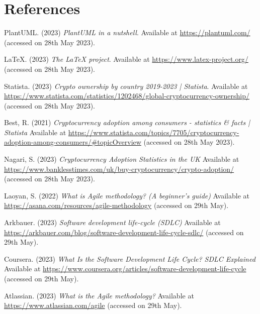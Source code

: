 \section{References}

\noindent [1] PlantUML. (2023) \textit{PlantUML in a nutshell}. Available at \url{https://plantuml.com/} (accessed on 28th May 2023).
\vspace{0.2cm}

\noindent [2] LaTeX. (2023) \textit{The LaTeX project}. Available at \url{https://www.latex-project.org/} (accessed on 28th May 2023).
\vspace{0.2cm}

\noindent [3] Statista. (2023) \textit{Crypto ownership by country 2019-2023 | Statista}. Available at \url{https://www.statista.com/statistics/1202468/global-cryptocurrency-ownership/} (accessed on 28th May 2023).
\vspace{0.2cm}

\noindent [4] Best, R. (2021) \textit{Cryptocurrency adoption among consumers - statistics \& facts | Statista} Available at \url{https://www.statista.com/topics/7705/cryptocurrency-adoption-among-consumers/#topicOverview} (accessed on 28th May 2023).
\vspace{0.2cm}

\noindent [5] Nagari, S. (2023) \textit{Cryptocurrency Adoption Statistics in the UK} Available at \url{https://www.banklesstimes.com/uk/buy-cryptocurrency/crypto-adoption/} (accessed on 28th May 2023).
\vspace{0.2cm}

\noindent [6] Laoyan, S. (2022) \textit{What is Agile methodology? (A beginner's guide)} Available at \url{https://asana.com/resources/agile-methodology} (accessed on 29th May).
\vspace{0.2cm}

\noindent [7] Arkbauer. (2023) \textit{Software development life-cycle (SDLC)} Available at \url{https://arkbauer.com/blog/software-development-life-cycle-sdlc/} (accessed on 29th May).
\vspace{0.2cm}

\noindent [8] Coursera. (2023) \textit{What Is the Software Development Life Cycle? SDLC Explained} Available at \url{https://www.coursera.org/articles/software-development-life-cycle} (accessed on 29th May).
\vspace{0.2cm}

\noindent [9] Atlassian. (2023) \textit{What is the Agile methodology?} Available at \url{https://www.atlassian.com/agile} (accessed on 29th May).
\vspace{0.2cm}


